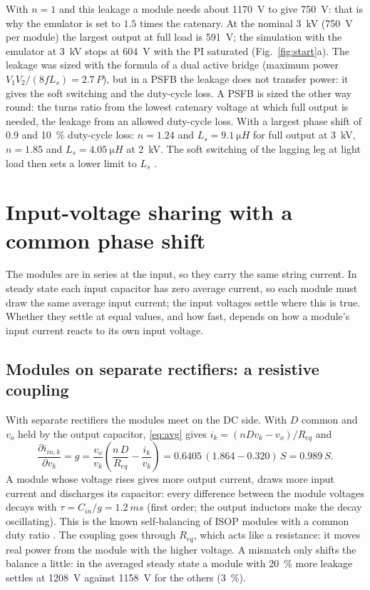 \documentclass[10pt,a4paper]{scrartcl}
\newcommand{\Req}{R_{eq}}
\newcommand{\Ls}{L_s}
\newcommand{\vo}{v_o}
\begin{document}
\begin{onehalfspace}
With $n = 1$ and this leakage a module needs about \SI{1170}{V} to give \SI{750}{V}: that is why the emulator is set to $1.5$ times the catenary. At the nominal \SI{3}{kV} (\SI{750}{V} per module) the largest output at full load is \SI{591}{V}; the simulation with the emulator at \SI{3}{kV} stops at \SI{604}{V} with the PI saturated (Fig.~\ref{fig:start}a). The leakage was sized with the formula of a dual active bridge (maximum power $V_1V_2/(8f\Ls) = 2.7\,P$), but in a PSFB the leakage does not transfer power: it gives the soft switching and the duty-cycle loss. A PSFB is sized the other way round: the turns ratio from the lowest catenary voltage at which full output is needed, the leakage from an allowed duty-cycle loss. With a largest phase shift of 0.9 and \SI{10}{\percent} duty-cycle loss: $n = 1.24$ and $\Ls = \SI{9.1}{\micro H}$ for full output at \SI{3}{kV}, $n = 1.85$ and $\Ls = \SI{4.05}{\micro H}$ at \SI{2}{kV}. The soft switching of the lagging leg at light load then sets a lower limit to $\Ls$ \cite{sabate1990}.

\section{Input-voltage sharing with a common phase shift}
\label{sec:sharing}

The modules are in series at the input, so they carry the same string current. In steady state each input capacitor has zero average current, so each module must draw the same average input current; the input voltages settle where this is true. Whether they settle at equal values, and how fast, depends on how a module's input current reacts to its own input voltage.

\subsection{Modules on separate rectifiers: a resistive coupling}

With separate rectifiers the modules meet on the DC side. With $D$ common and $\vo$ held by the output capacitor, \eqref{eq:avg} gives $i_k = (n D v_k - \vo)/\Req$ and
\begin{equation}
\frac{\partial i_{in,k}}{\partial v_k} = g = \frac{\vo}{v_k}\left(\frac{n\,D}{\Req} - \frac{i_k}{v_k}\right) = 0.6405\,(1.864 - 0.320)\,\si{S} = \SI{0.989}{S}.
\end{equation}
A module whose voltage rises gives more output current, draws more input current and discharges its capacitor: every difference between the module voltages decays with $\tau = C_{in}/g = \SI{1.2}{ms}$ (first order; the output inductors make the decay oscillating). This is the known self-balancing of ISOP modules with a common duty ratio \cite{giri2006}. The coupling goes through $\Req$, which acts like a resistance: it moves real power from the module with the higher voltage. A mismatch only shifts the balance a little: in the averaged steady state a module with \SI{20}{\percent} more leakage settles at \SI{1208}{V} against \SI{1158}{V} for the others (\SI{+3}{\percent}).


\end{onehalfspace}
\end{document}

